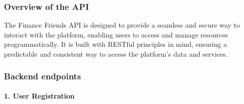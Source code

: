 \hypertarget{overview-of-the-api}{%
\subsubsection{Overview of the API}\label{overview-of-the-api}}

The Finance Friends API is designed to provide a seamless and secure way
to interact with the platform, enabling users to access and manage
resources programmatically. It is built with RESTful principles in mind,
ensuring a predictable and consistent way to access the platform's data
and services.

\hypertarget{backend-endpoints}{%
\subsubsection{Backend endpoints}\label{backend-endpoints}}

\hypertarget{user-registration}{%
\paragraph{1. User Registration}\label{user-registration}}

